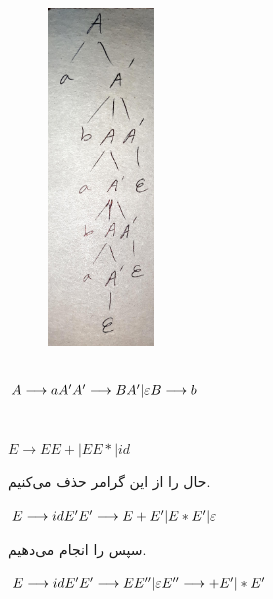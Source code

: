 \documentclass{article}
\begin{document}
\subsubsection{}
\begin{figure}[H]
    \centering
    \includegraphics[width=0.25\textwidth]{figures/c4.jpg}
    \caption
	{}
    \label{fig:fig1}
\end{figure}

\subsection{}
\begin{latin}
$
A \longrightarrow a A ^ \prime \\
A ^ \prime \longrightarrow B A ^ \prime | \varepsilon \\
B \longrightarrow b \\
$
\end{latin}



\section{}%
\begin{latin}
$
E \longrightarrow E E + | E E * | id
$
\end{latin}
حال  را از این گرامر حذف می‌کنیم.
\begin{latin}
$
E \longrightarrow id E ^ \prime \\
E ^ \prime \longrightarrow E + E ^ \prime | E * E ^ \prime | \varepsilon
$
\end{latin}
سپس  را انجام می‌دهیم.
\begin{latin}
$
E \longrightarrow id E ^ \prime \\
E ^ \prime \longrightarrow E E''  | \varepsilon \\
E'' \longrightarrow + E ^ \prime | * E ^ \prime
$
\end{latin}
\end{document}

